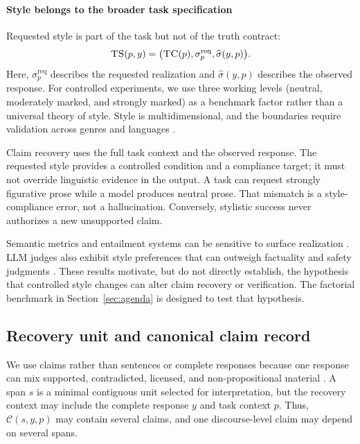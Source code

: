 \documentclass{clv2025}
\newcommand{\TC}{\textsc{TC}}
\newcommand{\TS}{\textsc{TS}}
\begin{document}
\paragraph{Style belongs to the broader task specification}
Requested style is part of the task but not of the truth contract:
\begin{equation}
  \TS(p,y)=\bigl(\TC(p),\sigma_p^{\mathrm{req}},
  \widehat{\sigma}(y,p)\bigr).
  \label{eq:ts}
\end{equation}
Here, $\sigma_p^{\mathrm{req}}$ describes the requested realization and
$\widehat{\sigma}(y,p)$ describes the observed response.
For controlled experiments, we use three working levels (neutral, moderately marked, and strongly marked) as a benchmark factor rather than a universal theory of style.
Style is multidimensional, and the boundaries require validation across genres and languages \citep{kang_style_2021,jin_deep_2022}.

Claim recovery uses the full task context and the observed response.
The requested style provides a controlled condition and a compliance target; it must not override linguistic evidence in the output.
A task can request strongly figurative prose while a model produces neutral prose.
That mismatch is a style-compliance error, not a hallucination.
Conversely, stylistic success never authorizes a new unsupported claim.

Semantic metrics and entailment systems can be sensitive to surface realization \citep{chen_menli_2023,aynetdinov_semscore_2024,lai_multidimensional_2023,pauli_mind_2025}.
LLM judges also exhibit style preferences that can outweigh factuality and safety judgments \citep{feuer_style_2025}.
These results motivate, but do not directly establish, the hypothesis that controlled style changes can alter claim recovery or verification.
The factorial benchmark in Section~\ref{sec:agenda} is designed to test that hypothesis.

\subsection{Recovery unit and canonical claim record}

We use claims rather than sentences or complete responses because one response can mix supported, contradicted, licensed, and non-propositional material \citep{min_factscore_2023,bayat_factbench_2024}.
A span $s$ is a minimal contiguous unit selected for interpretation, but the recovery context may include the complete response $y$ and task context $p$.
Thus, $\mathcal C(s,y,p)$ may contain several claims, and one discourse-level claim may depend on several spans.
\end{document}
